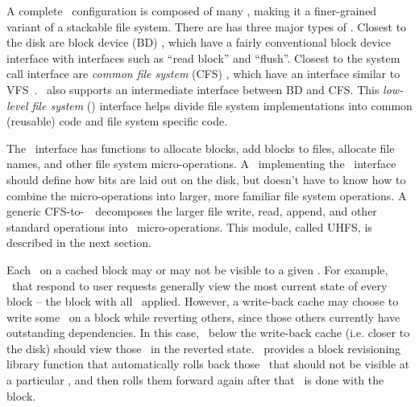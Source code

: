 
\label{sec:modules:interfaces}

\begin{comment}
New \modules\ are
simple to write, and by changing the \module\ arrangement, a broad range of
behaviors can be implemented. It's also easy to tell what behavior a given
arrangement will give just by looking at the connections between the \modules.
\end{comment}

A complete \Kudos\ configuration is composed of many \modules, making it
a finer-grained variant of a stackable file system.
%
There are has three major types of \modules.
%
Closest to the disk are block device (BD) \modules, which have a fairly
conventional block device interface with interfaces such as ``read block'' and
``flush''. 
%
Closest to the system call interface are \emph{common file system} (CFS)
\modules, which have an interface similar to VFS~\cite{kleiman86vnodes}. 
%
\Kudos\ also supports an intermediate interface between BD and CFS.
%
This \emph{low-level file system} (\LFS) interface helps divide file system
implementations into common (reusable) code and file system specific code. 
%
\begin{comment}
A
\Kudos\ file system designer combines modules with all three interfaces in many
ways -- a departure from stackable file systems, which act only at the VFS/CFS
layer. \Kudos\ \modules\ are implemented in C using structures of function
pointers to achieve object oriented behavior, very much like the rest of the
Linux kernel.
\end{comment}
%
The \LFS\ interface has functions to allocate blocks, add blocks to files,
allocate file names, and other file system micro-operations. A \module\ implementing
the \LFS\ interface should define how bits are laid out on the disk, but doesn't
have to know how to combine the micro-operations into larger, more familiar file system
operations. A generic CFS-to-\LFS\ \module\ decomposes the larger file write,
read, append, and other standard operations into \LFS\ micro-operations. This module,
called UHFS, is described in the next section.

Each \chdesc\ on a cached block may or may not be visible to a given \module.
For example, \modules\ that respond to user requests generally view the most
current state of every block -- the block with all \chdescs\ applied. However, a
write-back cache may choose to write some \chdescs\ on a block while reverting
others, since those others currently have outstanding dependencies. In this
case, \modules\ below the write-back cache (i.e. closer to the disk) should view
those \chdescs\ in the reverted state. \Kudos\ provides a block revisioning
library function that automatically rolls back those \chdescs\ that should not
be visible at a particular \module, and then rolls them forward again after that
\module\ is done with the block.
